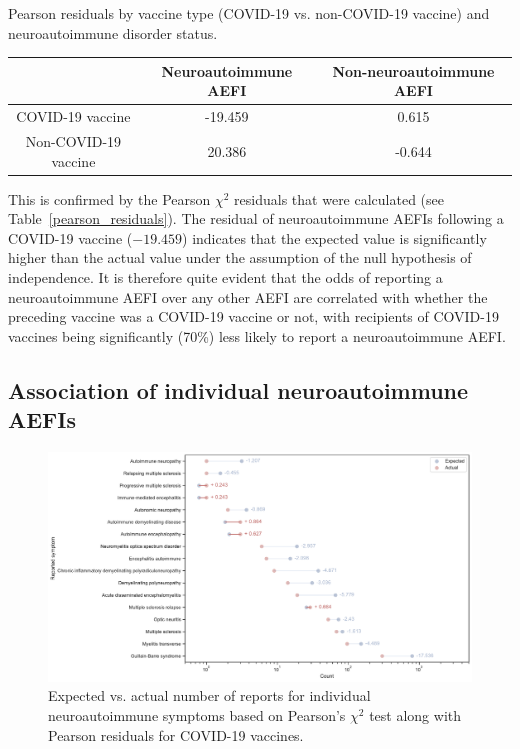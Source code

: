 \documentclass[idr,communication,submit,oneauthor,pdftex]{Definitions/mdpi}
\begin{document}
\begin{specialtable}[H]
\caption{Pearson residuals by vaccine type (COVID-19 vs. non-COVID-19 vaccine) and neuroautoimmune
disorder status.\label{pearson_residuals}}
\begin{tabular}{ccc}
\toprule
& \textbf{Neuroautoimmune AEFI}	& \textbf{Non-neuroautoimmune AEFI}\\
\midrule
COVID-19 vaccine	    	& -19.459               & 0.615  \\
Non-COVID-19 vaccine		& 20.386    	        & -0.644 \\
\bottomrule
\end{tabular}
\end{specialtable}

This is confirmed by the Pearson $\chi^2$ residuals that were calculated (see Table~\ref{pearson_residuals}). The residual of neuroautoimmune AEFIs following a COVID-19 vaccine ($-19.459$) indicates that the expected value is significantly higher than the actual value under the assumption of the null hypothesis of independence. It is therefore quite evident that the odds of reporting a neuroautoimmune AEFI over any other AEFI are correlated with whether the preceding vaccine was a COVID-19 vaccine or not, with recipients of COVID-19 vaccines being significantly (70\%) less likely to report a neuroautoimmune AEFI.

\subsection{Association of individual neuroautoimmune AEFIs}

\begin{figure}[H]
\includegraphics[width=12.5 cm]{expected_vs_actual_by_symptoms}
\caption{Expected vs. actual number of reports for individual neuroautoimmune symptoms based on Pearson's $\chi^2$ test
along with Pearson residuals for COVID-19 vaccines.\label{expected_vs_actual}}
\end{figure}
\end{document}
